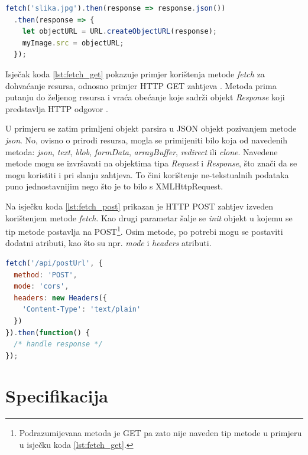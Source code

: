 \documentclass[times, utf8, zavrsni, numeric]{fer}
\newcommand{\razmakp}{\vspace{18pt}}
\newcommand{\razmaks}{\vspace{10pt}}
\begin{document}
\newpage

\razmakp
\begin{lstlisting}[language=JavaScript, caption={Primjer dohvata resursa s Fetch API}, label={lst:fetch_get}]
fetch('slika.jpg').then(response => response.json())
  .then(response => {
    let objectURL = URL.createObjectURL(response);
    myImage.src = objectURL;
  });
\end{lstlisting}
\razmaks

Isječak koda \ref{lst:fetch_get} pokazuje primjer korištenja metode \emph{fetch} za dohvaćanje resursa, odnosno primjer HTTP GET zahtjeva .
Metoda prima putanju do željenog resursa i vraća obećanje koje sadrži objekt \emph{Response} koji predstavlja HTTP odgovor .

U primjeru se zatim primljeni objekt parsira u JSON objekt pozivanjem metode \emph{json}.
No, ovisno o prirodi resursa, mogla se primijeniti bilo koja od navedenih metoda: \emph{json}, \emph{text}, \emph{blob}, \emph{formData}, \emph{arrayBuffer}, \emph{redirect} ili \emph{clone}\citep{fetch}.
Navedene metode mogu se izvršavati na objektima tipa \emph{Request} i \emph{Response}, što znači da se mogu koristiti i pri slanju zahtjeva.
To čini korištenje ne-tekstualnih podataka puno jednostavnijim nego što je to bilo s XMLHttpRequest.

\razmakp

Na isječku koda \ref{lst:fetch_post} prikazan je HTTP POST zahtjev  izveden korištenjem metode \emph{fetch}.
Kao drugi parametar šalje se \emph{init} objekt u kojemu se tip metode postavlja na POST\footnote{Podrazumijevana metoda je GET pa zato nije naveden tip metode u primjeru u isječku koda \ref{lst:fetch_get}.}.
Osim metode, po potrebi mogu se postaviti dodatni atributi, kao što su npr. \emph{mode} i \emph{headers} atributi.

\razmakp
\begin{lstlisting}[language=JavaScript, caption={Primjer slanja resursa s Fetch API}, label={lst:fetch_post}]
fetch('/api/postUrl', {
  method: 'POST', 
  mode: 'cors', 
  headers: new Headers({
    'Content-Type': 'text/plain'
  })
}).then(function() {
  /* handle response */
});
\end{lstlisting}
\razmaks



\chapter{Specifikacija}
\end{document}
